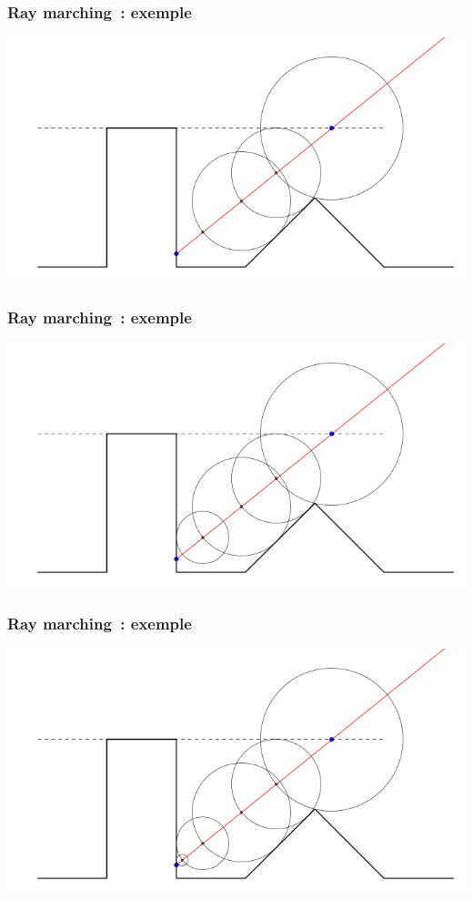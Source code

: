\documentclass{beamer}
\begin{document}
\begin{frame}
    \frametitle{Ray marching~: exemple}
    \includegraphics[width=\textwidth]{images/rayTracing-3}
\end{frame}
\begin{frame}
    \frametitle{Ray marching~: exemple}
    \includegraphics[width=\textwidth]{images/rayTracing-4}
\end{frame}
\begin{frame}
    \frametitle{Ray marching~: exemple}
    \includegraphics[width=\textwidth]{images/rayTracing-5}
\end{frame}
\end{document}
